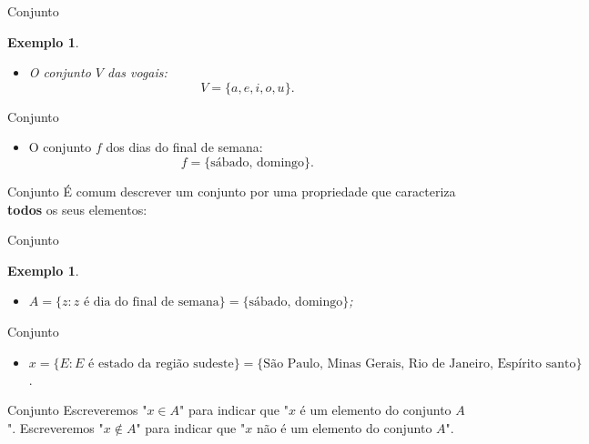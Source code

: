 \documentclass[10pt]{beamer}
\renewcommand{\indent}{\hspace*{2em}}
\theoremstyle{plain}
\newtheorem{ex}[defn]{Exemplo}
\begin{document}
\begin{frame}{Conjunto}
\begin{ex}
 \begin{itemize}
    \item O conjunto $V$ das vogais:
    $$V=\{a,e,i,o,u\}.$$
\end{itemize}
\end{ex}
\end{frame}

\begin{frame}{Conjunto}
\begin{block}{}
 \begin{itemize}
    \item O conjunto $f$ dos dias do final de semana:
    $$f=\{\mbox{sábado, domingo}\}.$$
\end{itemize}
\end{block}
\end{frame}

\begin{frame}{Conjunto}
 \indent É comum descrever um conjunto por uma propriedade que caracteriza \textbf{todos} os seus elementos:
\end{frame}

\begin{frame}{Conjunto}
\begin{ex}
 \begin{itemize}
     \item $A=\{z:z\mbox{ é dia do final de semana}\}=\{\mbox{sábado, domingo}\}$;
 \end{itemize}
\end{ex}
\end{frame}

\begin{frame}{Conjunto}
\begin{block}{}
 \begin{itemize}
     \item $x=\{E:E\mbox{ é estado da região sudeste}\}=
     \{\mbox{São Paulo, Minas Gerais, Rio de Janeiro, Espírito santo}\}$.
 \end{itemize}
\end{block}
\end{frame}

\begin{frame}{Conjunto}
\indent Escreveremos "$x\in A$" para indicar que "$x$ é um elemento do conjunto $A$". Escreveremos "$x\notin A$" para indicar que "$x$ não é um elemento do conjunto $A$".
\end{frame}
\end{document}
